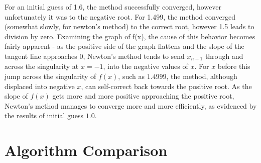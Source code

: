 \documentclass[11pt]{article} %
\begin{document}
\par For an initial guess of 1.6, the method successfully converged, however unfortunately it was to the negative root. For 1.499, the method converged (somewhat slowly, for newton's method) to the correct root, however 1.5 leads to division by zero. Examining the graph of f(x), the cause of this behavior becomes fairly apparent - as the positive side of the graph flattens and the slope of the tangent line approaches $0$, Newton's method tends to send $x_{n+1}$ through and across the singularity at $x = -1$, into the negative values of $x$. For $x$ before this jump across the singularity of $f(x)$, such as $1.4999$, the method, although displaced into negative $x$, can self-correct back towards the positive root. As the slope of $f(x)$ gets more and more positive approaching the positive root, Newton's method manages to converge more and more efficiently, as evidenced by the results of initial guess $1.0$.

\newpage
\section*{Algorithm Comparison}
\end{document}
